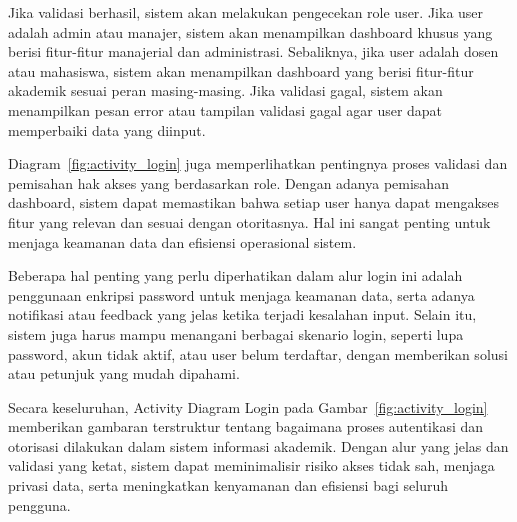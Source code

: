 \documentclass[a4paper,oneside,11pt]{book}
\begin{document}
Jika validasi berhasil, sistem akan melakukan pengecekan role user. Jika user adalah admin atau manajer, sistem akan menampilkan dashboard khusus yang berisi fitur-fitur manajerial dan administrasi. Sebaliknya, jika user adalah dosen atau mahasiswa, sistem akan menampilkan dashboard yang berisi fitur-fitur akademik sesuai peran masing-masing. Jika validasi gagal, sistem akan menampilkan pesan error atau tampilan validasi gagal agar user dapat memperbaiki data yang diinput.

Diagram~\ref{fig:activity_login} juga memperlihatkan pentingnya proses validasi dan pemisahan hak akses yang berdasarkan role. Dengan adanya pemisahan dashboard, sistem dapat memastikan bahwa setiap user hanya dapat mengakses fitur yang relevan dan sesuai dengan otoritasnya. Hal ini sangat penting untuk menjaga keamanan data dan efisiensi operasional sistem.

Beberapa hal penting yang perlu diperhatikan dalam alur login ini adalah penggunaan enkripsi password untuk menjaga keamanan data, serta adanya notifikasi atau feedback yang jelas ketika terjadi kesalahan input. Selain itu, sistem juga harus mampu menangani berbagai skenario login, seperti lupa password, akun tidak aktif, atau user belum terdaftar, dengan memberikan solusi atau petunjuk yang mudah dipahami.

Secara keseluruhan, Activity Diagram Login pada Gambar~\ref{fig:activity_login} memberikan gambaran terstruktur tentang bagaimana proses autentikasi dan otorisasi dilakukan dalam sistem informasi akademik. Dengan alur yang jelas dan validasi yang ketat, sistem dapat meminimalisir risiko akses tidak sah, menjaga privasi data, serta meningkatkan kenyamanan dan efisiensi bagi seluruh pengguna.
\end{document}
